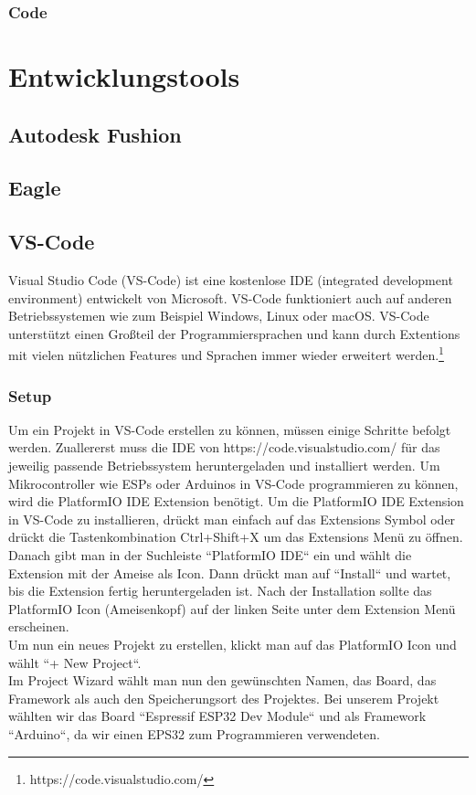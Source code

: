 \documentclass[ngerman,12pt,a4paper]{article}
\begin{document}
			\subsubsection{Code} %
	
	
	\section{Entwicklungstools}
	
	 \subsection{Autodesk Fushion}
	 
	 \subsection{Eagle}
	 	 
	 \subsection{VS-Code}
	 
	 Visual Studio Code (VS-Code) ist eine kostenlose IDE (integrated development environment) entwickelt von Microsoft. VS-Code funktioniert auch auf anderen Betriebssystemen wie zum Beispiel Windows, Linux oder macOS. VS-Code unterstützt einen Großteil der Programmiersprachen und kann durch Extentions mit vielen nützlichen Features und Sprachen immer wieder erweitert werden.\footnote{https://code.visualstudio.com/}
	 	
	 	\subsubsection{Setup}
	 	
	 Um ein Projekt in VS-Code erstellen zu können, müssen einige Schritte befolgt werden. Zuallererst muss die IDE von https://code.visualstudio.com/ für das jeweilig passende Betriebssystem heruntergeladen und installiert werden. Um Mikrocontroller wie ESPs oder Arduinos in VS-Code programmieren zu können, wird die PlatformIO IDE Extension benötigt. Um die PlatformIO IDE Extension in VS-Code zu installieren, drückt man einfach auf das Extensions Symbol oder drückt die Tastenkombination Ctrl+Shift+X um das Extensions Menü zu öffnen. Danach gibt man in der Suchleiste “PlatformIO IDE“ ein und wählt die Extension mit der Ameise als Icon. Dann drückt man auf “Install“ und wartet, bis die Extension fertig heruntergeladen ist. Nach der Installation sollte das PlatformIO Icon (Ameisenkopf) auf der linken Seite unter dem Extension Menü erscheinen. \\[0.5cm]
	 Um nun ein neues Projekt zu erstellen, klickt man auf das PlatformIO Icon und wählt “+ New Project“. \\[0.5cm]
	 Im Project Wizard wählt man nun den gewünschten Namen, das Board, das Framework als auch den Speicherungsort des Projektes. Bei unserem Projekt wählten wir das Board “Espressif ESP32 Dev Module“ und als Framework “Arduino“, da wir einen EPS32 zum Programmieren verwendeten. \\[0.5cm]
	 	
\end{document}
